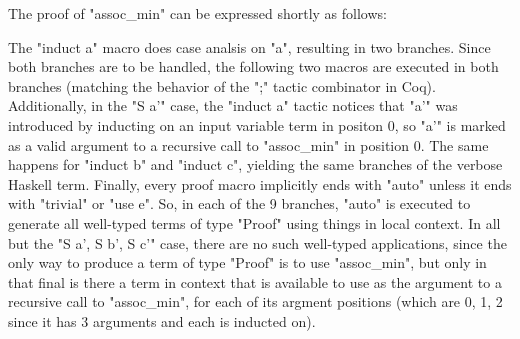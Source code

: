 The proof of "assoc\_min" can be expressed shortly as follows:
  
 The "induct a" macro does case analsis on "a", resulting in two branches. Since both branches are to be handled, the following two macros are executed in both branches (matching the behavior of the ";" tactic combinator in Coq).
 Additionally, in the "S a'" case, the "induct a" tactic notices that "a'" was introduced by inducting on an input variable term in positon 0, so "a'" is marked as a valid argument to a recursive call to "assoc\_min" in position 0.
 The same happens for "induct b" and "induct c", yielding the same branches of the verbose Haskell term.
 Finally, every proof macro implicitly ends with "auto" unless it ends with "trivial" or "use e".
 So, in each of the 9 branches, "auto" is executed to generate all well-typed terms of type "Proof" using things in local context.
 In all but the "S a', S b', S c'" case, there are no such well-typed applications, since the only way to produce a term of type "Proof" is to use "assoc\_min", but only in that final is there a term in context that is available to use as the argument to a recursive call to "assoc\_min", for each of its argment positions (which are 0, 1, 2 since it has 3 arguments and each is inducted on).
  